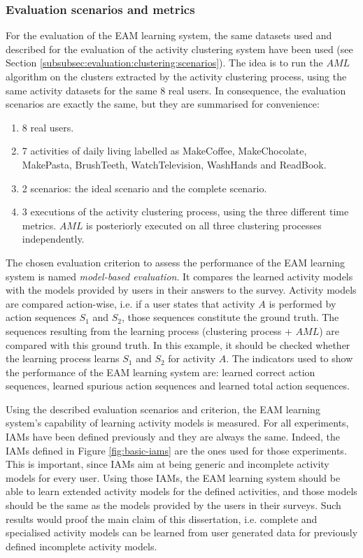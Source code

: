 \subsubsection{Evaluation scenarios and metrics}
\label{subsubsec:evaluation:eam:scenarios}

For the evaluation of the EAM learning system, the same datasets used and described for the evaluation of the activity clustering system have been used (see Section \ref{subsubsec:evaluation:clustering:scenarios}). The idea is to run the $AML$ algorithm on the clusters extracted by the activity clustering process, using the same activity datasets for the same 8 real users. In consequence, the evaluation scenarios are exactly the same, but they are summarised for convenience:

\begin{enumerate}
 \item 8 real users.
 \item 7 activities of daily living labelled as MakeCoffee, MakeChocolate, MakePasta, BrushTeeth, WatchTelevision, WashHands and ReadBook. 
 \item 2 scenarios: the ideal scenario and the complete scenario.
 \item 3 executions of the activity clustering process, using the three different time metrics. $AML$ is posteriorly executed on all three clustering processes independently.
\end{enumerate}

The chosen evaluation criterion to assess the performance of the EAM learning system is named \textit{model-based evaluation}. It compares the learned activity models with the models provided by users in their answers to the survey. Activity models are compared action-wise, i.e. if a user states that activity $A$ is performed by action sequences $S_1$ and $S_2$, those sequences constitute the ground truth. The sequences resulting from the learning process (clustering process + $AML$) are compared with this ground truth. In this example, it should be checked whether the learning process learns $S_1$ and $S_2$ for activity $A$. The indicators used to show the performance of the EAM learning system are: learned correct action sequences, learned spurious action sequences and learned total action sequences.

Using the described evaluation scenarios and criterion, the EAM learning system's capability of learning activity models is measured. For all experiments, IAMs have been defined previously and they are always the same. Indeed, the IAMs defined in Figure \ref{fig:basic-iams} are the ones used for those experiments. This is important, since IAMs aim at being generic and incomplete activity models for every user. Using those IAMs, the EAM learning system should be able to learn extended activity models for the defined activities, and those models should be the same as the models provided by the users in their surveys. Such results would proof the main claim of this dissertation, i.e. complete and specialised activity models can be learned from user generated data for previously defined incomplete activity models.

